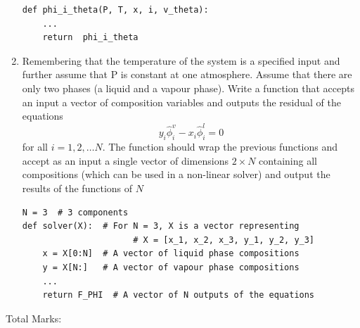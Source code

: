 \documentclass[12pt, A4paper]{article}
\newcounter{variables}
\newcounter{outputs}
\begin{document}
\begin{enumerate}
\begin{lstlisting}
def phi_i_theta(P, T, x, i, v_theta):
    ...
    return  phi_i_theta
\end{lstlisting}

\begin{flushright} 
\end{flushright}

\item Remembering that the temperature of the system is a specified input and further assume that P is constant at one atmosphere. Assume that there are only two phases (a liquid and a vapour phase). Write a function that accepts an input a vector of composition variables and outputs the residual of the equations $$y_i \hat{\phi}_i^v  - x_i \hat{\phi}_i^l = 0$$ for all $i = 1, 2, \dots N $. The function should wrap the previous functions and accept as an input a single vector of dimensions $2 \times N $ containing all compositions (which can be used in a non-linear solver) and output the results of the functions of  $N$

\begin{lstlisting}
N = 3  # 3 components
def solver(X):  # For N = 3, X is a vector representing 
	  	   			  # X = [x_1, x_2, x_3, y_1, y_2, y_3]
    x = X[0:N]  # A vector of liquid phase compositions
    y = X[N:]   # A vector of vapour phase compositions
    ...
    return F_PHI  # A vector of N outputs of the equations
\end{lstlisting}

\begin{flushright} 
\end{flushright}

\end{enumerate}

 
\begin{centering}
Total Marks: \\
\end{centering}


%

\end{document}
